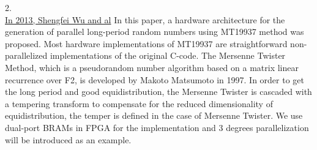 \label{Mastrine Tewister}
2.\\
\underline{In 2013, Shengfei Wu and al} In this paper, a hardware architecture for the generation of parallel long-period random numbers using MT19937 method was proposed. Most hardware implementations of MT19937 are straightforward non-parallelized implementations of the original C-code. The Mersenne Twister Method, which is a pseudorandom number algorithm based on a matrix linear recurrence over F2, is developed by Makoto Matsumoto in 1997. In order to get the long period and good equidistribution, the Mersenne Twister is cascaded with a tempering transform to compensate for the reduced dimensionality of equidistribution, the temper is defined in the case of Mersenne Twister. We use dual-port BRAMs in FPGA for the implementation and 3 degrees parallelization will be introduced as an example.